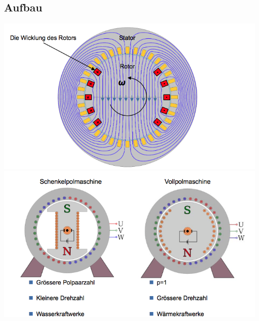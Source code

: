 \subsection{Aufbau}
\begin{minipage}{0.5 \linewidth}
\includegraphics[width = \linewidth]{./Pics/VL1011/Aufbau}
\includegraphics[width = \linewidth]{./Pics/VL1011/Aufbau3}
\end{minipage}
